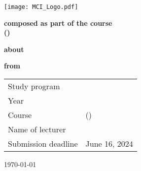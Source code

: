 
\thispagestyle{empty}
\thispdfpagelabel{} %
\begin{center}
	\textbf{\Huge \university}\par
	\vspace{8ex}\par
	\textbf{\LARGE \department}\par
	\vspace{4ex}\par
	\textbf{\Large \studyProgram}\par
	\vspace{4ex}\par
	\texttt{[image: MCI\_Logo.pdf]}\par
	\vspace{4ex}\par
	\textbf{\LARGE \docType}\par
	\vspace{2ex}\par
	\textbf{composed as part of the course\\[0.5ex] \courseName{} (\courseCode)}\par
	\vspace{4ex}\par
	\textbf{about}\par
	\vspace{4ex}\par
	\textbf{\LARGE \docTitle}\par
	\vspace{4ex}\par
	\textbf{from}\par
	\vspace{4ex}\par
	\textbf{\Large \href{\authorAContact}{\authorAName}}
\end{center}
\vspace{4ex}
\begin{tabular}{ll}
	Study program & \studyProgram\\[0.5ex]
	Year & \studyYear\\[0.5ex]
	Course & \courseName{} (\courseCode)\\[0.5ex]
	Name of lecturer & \href{\lecturerContact}{\lecturerName}\\[0.5ex]
	Submission deadline & June 16, 2024
\end{tabular}
\vfill
\begin{center}
	\today
\end{center}
